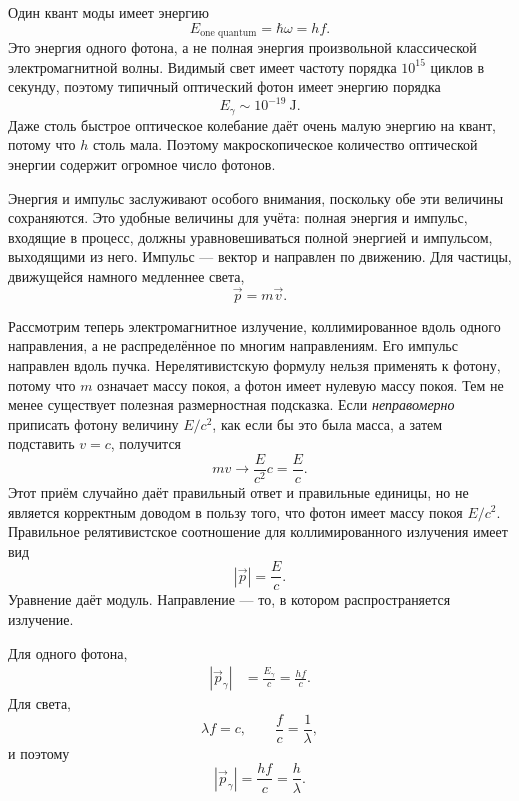 Один квант моды имеет энергию
\begin{equation}
E_{\text{one quantum}}=\hbar\omega=hf.
\end{equation}
Это энергия одного фотона, а не полная энергия произвольной классической электромагнитной волны. Видимый свет имеет частоту порядка \(10^{15}\) циклов в секунду, поэтому типичный оптический фотон имеет энергию порядка
\begin{equation}
E_\gamma\sim 10^{-19}\ \mathrm{J}.
\end{equation}
Даже столь быстрое оптическое колебание даёт очень малую энергию на квант, потому что \(h\) столь мала. Поэтому макроскопическое количество оптической энергии содержит огромное число фотонов.

Энергия и импульс заслуживают особого внимания, поскольку обе эти величины сохраняются. Это удобные величины для учёта: полная энергия и импульс, входящие в процесс, должны уравновешиваться полной энергией и импульсом, выходящими из него. Импульс — вектор и направлен по движению. Для частицы, движущейся намного медленнее света,
\begin{equation}
\vec p=m\vec v.
\end{equation}

Рассмотрим теперь электромагнитное излучение, коллимированное вдоль одного направления, а не распределённое по многим направлениям. Его импульс направлен вдоль пучка. Нерелятивистскую формулу нельзя применять к фотону, потому что \(m\) означает массу покоя, а фотон имеет нулевую массу покоя. Тем не менее существует полезная размерностная подсказка. Если \emph{неправомерно} приписать фотону величину \(E/c^2\), как если бы это была масса, а затем подставить \(v=c\), получится
\begin{equation}
mv\longrightarrow \frac{E}{c^2}c=\frac{E}{c}.
\end{equation}
Этот приём случайно даёт правильный ответ и правильные единицы, но не является корректным доводом в пользу того, что фотон имеет массу покоя \(E/c^2\). Правильное релятивистское соотношение для коллимированного излучения имеет вид
\begin{equation}
|\vec p|=\frac{E}{c}.
\end{equation}
Уравнение даёт модуль. Направление — то, в котором распространяется излучение.

Для одного фотона,
\begin{align}
|\vec p_\gamma|
&=\frac{E_\gamma}{c}
=\frac{hf}{c}.
\end{align}
Для света,
\begin{equation}
\lambda f=c,
\qquad
\frac{f}{c}=\frac{1}{\lambda},
\end{equation}
и поэтому
\begin{equation}
|\vec p_\gamma|=\frac{hf}{c}=\frac{h}{\lambda}.
\end{equation}

